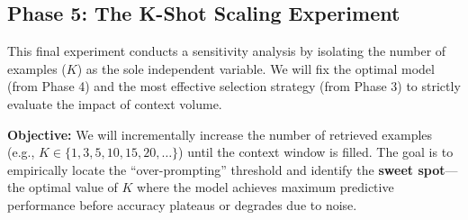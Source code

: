\documentclass{article}
\begin{document}
\subsection{Phase 5: The K-Shot Scaling Experiment}
This final experiment conducts a sensitivity analysis by isolating the number of examples ($K$) as the sole independent variable. We will fix the optimal model (from Phase 4) and the most effective selection strategy (from Phase 3) to strictly evaluate the impact of context volume.

\textbf{Objective:} We will incrementally increase the number of retrieved examples (e.g., $K \in \{1, 3, 5, 10, 15, 20, \dots\}$) until the context window is filled. The goal is to empirically locate the ``over-prompting'' threshold and identify the \textbf{sweet spot}—the optimal value of $K$ where the model achieves maximum predictive performance before accuracy plateaus or degrades due to noise.



\end{document}
